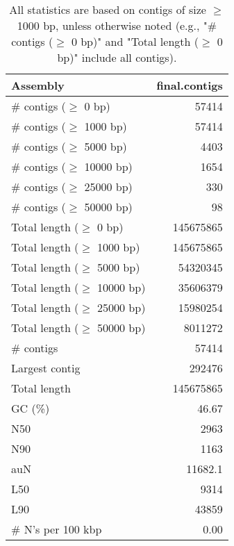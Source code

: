 \documentclass[12pt,a4paper]{article}
\begin{document}
\begin{table}[ht]
\begin{center}
\caption{All statistics are based on contigs of size $\geq$ 1000 bp, unless otherwise noted (e.g., "\# contigs ($\geq$ 0 bp)" and "Total length ($\geq$ 0 bp)" include all contigs).}
\begin{tabular}{|l*{1}{|r}|}
\hline
Assembly & final.contigs \\ \hline
\# contigs ($\geq$ 0 bp) & 57414 \\ \hline
\# contigs ($\geq$ 1000 bp) & 57414 \\ \hline
\# contigs ($\geq$ 5000 bp) & 4403 \\ \hline
\# contigs ($\geq$ 10000 bp) & 1654 \\ \hline
\# contigs ($\geq$ 25000 bp) & 330 \\ \hline
\# contigs ($\geq$ 50000 bp) & 98 \\ \hline
Total length ($\geq$ 0 bp) & 145675865 \\ \hline
Total length ($\geq$ 1000 bp) & 145675865 \\ \hline
Total length ($\geq$ 5000 bp) & 54320345 \\ \hline
Total length ($\geq$ 10000 bp) & 35606379 \\ \hline
Total length ($\geq$ 25000 bp) & 15980254 \\ \hline
Total length ($\geq$ 50000 bp) & 8011272 \\ \hline
\# contigs & 57414 \\ \hline
Largest contig & 292476 \\ \hline
Total length & 145675865 \\ \hline
GC (\%) & 46.67 \\ \hline
N50 & 2963 \\ \hline
N90 & 1163 \\ \hline
auN & 11682.1 \\ \hline
L50 & 9314 \\ \hline
L90 & 43859 \\ \hline
\# N's per 100 kbp & 0.00 \\ \hline
\end{tabular}
\end{center}
\end{table}
\end{document}

